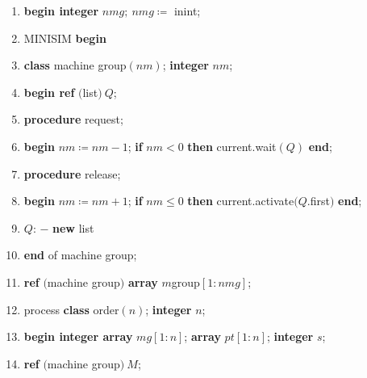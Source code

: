 \documentclass[twoside,11pt]{book}
\begin{document}
\begin{enumerate}[nosep, label=\arabic*.]
	\label{pg:program-job-shop}
	
	\item \label{pg:program-job-shop-1}
	\textbf{begin integer} $nmg;\ nmg \coloneq$ inint;
	 
	\item MINISIM \textbf{begin}
	
	\item \label{pg:program-job-shop-3}
	\textbf{class} machine group$(nm)$; \textbf{integer} $nm$;
	
	\item \label{pg:program-job-shop-4}
	\textbf{begin ref} $($list$)\ Q$;
	
	\item \label{pg:program-job-shop-5}
	\quad \textbf{procedure} request;
	
	\item \label{pg:program-job-shop-6}
	\quad \textbf{begin} $nm \coloneq nm - 1$; \textbf{if} $nm < 0$ \textbf{then} current.wait$(Q)$ \textbf{end};
	
	\item \label{pg:program-job-shop-7}
	\quad \textbf{procedure} release;
	
	\item \label{pg:program-job-shop-8}
	\quad \textbf{begin} $nm \coloneq nm + 1$; \textbf{if} $nm \leqslant 0$ \textbf{then} current.activate$(Q$.first$)$ \textbf{end};
	
	\item \label{pg:program-job-shop-9}
	\quad $Q$: $-$ \textbf{new} list
	
	\item \label{pg:program-job-shop-10}
	\textbf{end} of machine group;
	
	\item \label{pg:program-job-shop-11}
	\textbf{ref} $($machine group$)$ \textbf{array} $m$group$[1:nmg]$;
	
	\item \label{pg:program-job-shop-12}
	process \textbf{class} order$(n)$; \textbf{integer} $n$;
	
	\item \label{pg:program-job-shop-13}
	\textbf{begin integer array} $mg[1:n]$; \textbf{array} $pt[1:n]$; \textbf{integer} $s$;
	
	\item \label{pg:program-job-shop-14}
	\quad \textbf{ref} $($machine group$)\ M$;
	

\end{enumerate}
\end{document}
